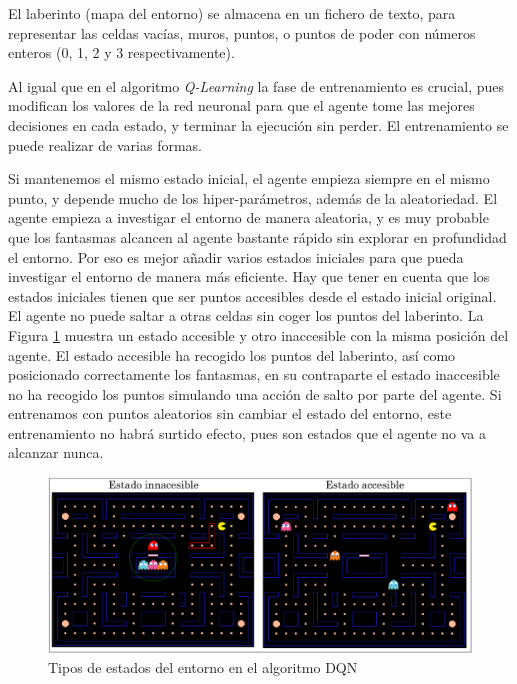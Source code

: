 		
		El laberinto (mapa del entorno) se almacena en un fichero de texto, para representar las celdas vacías, muros, puntos, o puntos de poder con números enteros (0, 1, 2 y 3 respectivamente).
		
		
		Al igual que en el algoritmo \textit{Q-Learning} la fase de entrenamiento es crucial, pues modifican los valores de la red neuronal para que el agente tome las mejores decisiones en cada estado, y terminar la ejecución sin perder. El entrenamiento se puede realizar de varias formas.	
			
							
		Si mantenemos el mismo estado inicial, el agente empieza siempre en el mismo punto, y depende mucho de los hiper-parámetros, además de la aleatoriedad. El agente empieza a investigar el entorno de manera aleatoria, y es muy probable que los fantasmas alcancen al agente bastante rápido sin explorar en profundidad el entorno. Por eso es mejor añadir varios estados iniciales para que pueda investigar el entorno de manera más eficiente. Hay que tener en cuenta que los estados iniciales tienen que ser puntos accesibles desde el estado inicial original. El agente no puede saltar a otras celdas sin coger los puntos del laberinto. La Figura \ref{fig:pacman_states} muestra un estado accesible y otro inaccesible con la misma posición del agente. El estado accesible ha recogido los puntos del laberinto, así como posicionado correctamente los fantasmas, en su contraparte el estado inaccesible no ha recogido los puntos simulando una acción de salto por parte del agente. Si entrenamos con puntos aleatorios sin cambiar el estado del entorno, este entrenamiento no habrá surtido efecto, pues son estados que el agente no va a alcanzar nunca.
			
		
		\begin{figure}[!h]
			\centering
			\includegraphics[width=1\textwidth]{images/chapter_3/pacman_states}	
			\caption{Tipos de estados del entorno en el algoritmo DQN}
			\label{fig:pacman_states}
		\end{figure}
		
